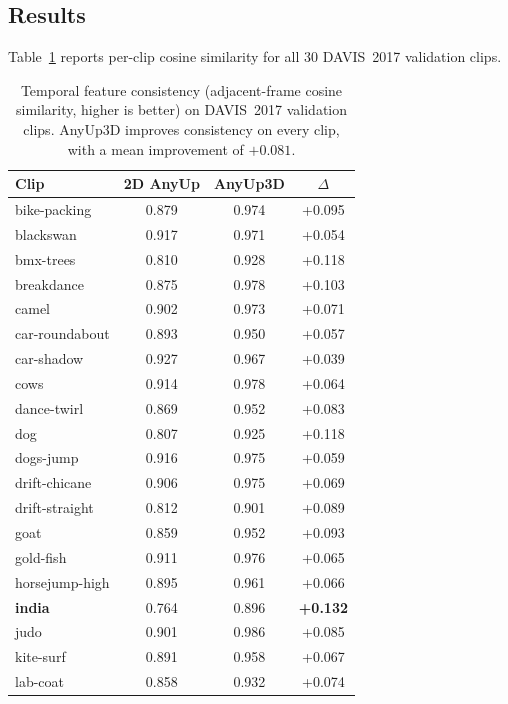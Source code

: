 \subsection{Results}

Table~\ref{tab:temporal} reports per-clip cosine similarity for all 30 DAVIS~2017 validation clips.

\begin{table}[t]
\centering
\caption{%
    Temporal feature consistency (adjacent-frame cosine similarity, higher is better) on DAVIS~2017 validation clips.
    AnyUp3D improves consistency on every clip, with a mean improvement of $+0.081$.
}
\label{tab:temporal}
\small
\begin{tabular}{lccc}
\toprule
\textbf{Clip} & \textbf{2D AnyUp} & \textbf{AnyUp3D} & \textbf{$\Delta$} \\
\midrule
bike-packing       & 0.879 & 0.974 & +0.095 \\
blackswan          & 0.917 & 0.971 & +0.054 \\
bmx-trees          & 0.810 & 0.928 & +0.118 \\
breakdance         & 0.875 & 0.978 & +0.103 \\
camel              & 0.902 & 0.973 & +0.071 \\
car-roundabout     & 0.893 & 0.950 & +0.057 \\
car-shadow         & 0.927 & 0.967 & +0.039 \\
cows               & 0.914 & 0.978 & +0.064 \\
dance-twirl        & 0.869 & 0.952 & +0.083 \\
dog                & 0.807 & 0.925 & +0.118 \\
dogs-jump          & 0.916 & 0.975 & +0.059 \\
drift-chicane      & 0.906 & 0.975 & +0.069 \\
drift-straight     & 0.812 & 0.901 & +0.089 \\
goat               & 0.859 & 0.952 & +0.093 \\
gold-fish          & 0.911 & 0.976 & +0.065 \\
horsejump-high     & 0.895 & 0.961 & +0.066 \\
\textbf{india}     & 0.764 & 0.896 & \textbf{+0.132} \\
judo               & 0.901 & 0.986 & +0.085 \\
kite-surf          & 0.891 & 0.958 & +0.067 \\
lab-coat           & 0.858 & 0.932 & +0.074 \\

\end{tabular}
\end{table}

